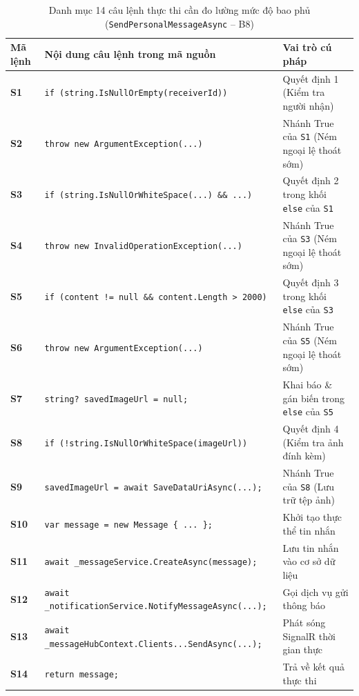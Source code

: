 \documentclass[11pt,a4paper]{article}
\begin{document}
\begin{table}[H]
\centering
\scriptsize
\begin{tabularx}{\textwidth}{|C{1.4cm}|L{6.2cm}|X|}
\hline
{}
\textbf{Mã lệnh} & \textbf{Nội dung câu lệnh trong mã nguồn} & \textbf{Vai trò cú pháp} \tabularnewline
\hline
\textbf{S1} & \texttt{if (string.IsNullOrEmpty(receiverId))} & Quyết định 1 (Kiểm tra người nhận) \\ \hline
\textbf{S2} & \texttt{throw new ArgumentException(...)} & Nhánh True của \texttt{S1} (Ném ngoại lệ thoát sớm) \\ \hline
\textbf{S3} & \texttt{if (string.IsNullOrWhiteSpace(...) \&\& ...)} & Quyết định 2 trong khối \texttt{else} của \texttt{S1} \\ \hline
\textbf{S4} & \texttt{throw new InvalidOperationException(...)} & Nhánh True của \texttt{S3} (Ném ngoại lệ thoát sớm) \\ \hline
\textbf{S5} & \texttt{if (content != null \&\& content.Length > 2000)} & Quyết định 3 trong khối \texttt{else} của \texttt{S3} \\ \hline
\textbf{S6} & \texttt{throw new ArgumentException(...)} & Nhánh True của \texttt{S5} (Ném ngoại lệ thoát sớm) \\ \hline
\textbf{S7} & \texttt{string? savedImageUrl = null;} & Khai báo \& gán biến trong \texttt{else} của \texttt{S5} \\ \hline
\textbf{S8} & \texttt{if (!string.IsNullOrWhiteSpace(imageUrl))} & Quyết định 4 (Kiểm tra ảnh đính kèm) \\ \hline
\textbf{S9} & \texttt{savedImageUrl = await SaveDataUriAsync(...);} & Nhánh True của \texttt{S8} (Lưu trữ tệp ảnh) \\ \hline
\textbf{S10} & \texttt{var message = new Message \{ ... \};} & Khởi tạo thực thể tin nhắn \\ \hline
\textbf{S11} & \texttt{await \_messageService.CreateAsync(message);} & Lưu tin nhắn vào cơ sở dữ liệu \\ \hline
\textbf{S12} & \texttt{await \_notificationService.NotifyMessageAsync(...);} & Gọi dịch vụ gửi thông báo \\ \hline
\textbf{S13} & \texttt{await \_messageHubContext.Clients...SendAsync(...);} & Phát sóng SignalR thời gian thực \\ \hline
\textbf{S14} & \texttt{return message;} & Trả về kết quả thực thi \\ \hline
\end{tabularx}
\caption{Danh mục 14 câu lệnh thực thi cần đo lường mức độ bao phủ (\texttt{SendPersonalMessageAsync} -- B8)}
\end{table}
\end{document}
